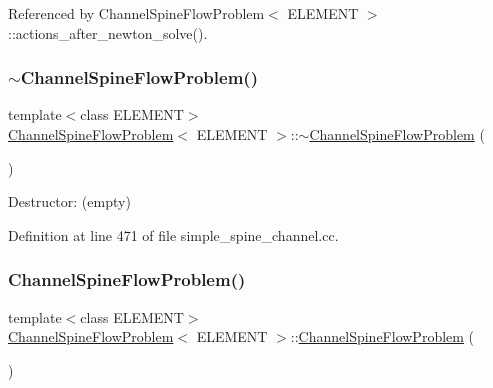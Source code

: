 Referenced by Channel\+Spine\+Flow\+Problem$<$ E\+L\+E\+M\+E\+N\+T $>$\+::actions\+\_\+after\+\_\+newton\+\_\+solve().

\mbox{\label{classChannelSpineFlowProblem_abdf2cc520915167d8718499459df348b}} 
\subsubsection{\texorpdfstring{$\sim$\+Channel\+Spine\+Flow\+Problem()}{~ChannelSpineFlowProblem()}\hspace{0.1cm}{\footnotesize\ttfamily [1/2]}}
{\footnotesize\ttfamily template$<$class E\+L\+E\+M\+E\+NT$>$ \\
\hyperlink{classChannelSpineFlowProblem}{Channel\+Spine\+Flow\+Problem}$<$ E\+L\+E\+M\+E\+NT $>$\+::$\sim$\hyperlink{classChannelSpineFlowProblem}{Channel\+Spine\+Flow\+Problem} (\begin{DoxyParamCaption}{ }\end{DoxyParamCaption})\hspace{0.3cm}{\ttfamily [inline]}}



Destructor\+: (empty) 



Definition at line 471 of file simple\+\_\+spine\+\_\+channel.\+cc.

\mbox{\label{classChannelSpineFlowProblem_a23f1b987e3395b1d101eaf3f3b5c94b2}} 
\subsubsection{\texorpdfstring{Channel\+Spine\+Flow\+Problem()}{ChannelSpineFlowProblem()}\hspace{0.1cm}{\footnotesize\ttfamily [2/2]}}
{\footnotesize\ttfamily template$<$class E\+L\+E\+M\+E\+NT$>$ \\
\hyperlink{classChannelSpineFlowProblem}{Channel\+Spine\+Flow\+Problem}$<$ E\+L\+E\+M\+E\+NT $>$\+::\hyperlink{classChannelSpineFlowProblem}{Channel\+Spine\+Flow\+Problem} (\begin{DoxyParamCaption}{ }\end{DoxyParamCaption})}



